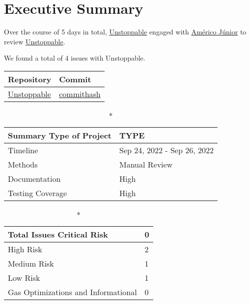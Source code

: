 \hypertarget{executive-summary}{%
\section{Executive Summary}\label{executive-summary}}

Over the course of 5 days in total, \href{https://www.damnvulnerabledefi.xyz/challenges/1.html}{Unstoppable} engaged with
\href{https://americojunior.com}{Américo Júnior} to review
\href{https://www.damnvulnerabledefi.xyz/challenges/1.html}{Unstoppable}. 

We found a total of 4 issues with Unstoppable. 

\begin{longtable}[c]{|l|l|}
\hline \textbf{Repository} & \textbf{Commit} \\

\hline
\href{https://www.damnvulnerabledefi.xyz/challenges/1.html}{Unstoppable} &
\href{https://github.com/permalink/commit/commithash}{commithash} \\
\hline
\end{longtable}

\begin{longtable}[]{|l|l|}

\caption*{\textbf{Summary}}
\hline Type of Project & TYPE \\   
\hline Timeline & Sep 24, 2022 - Sep 26, 2022   \\
\hline Methods & Manual Review \\
\hline Documentation & High \\
\hline Testing Coverage & High  \\
\hline
\end{longtable}


\begin{longtable}[]{|l|l|}
\caption*{\textbf{Total Issues}}
\hline Critical Risk & 0 \\
\hline High Risk & 2 \\
\hline Medium Risk & 1 \\ 
\hline Low Risk & 1 \\
\hline Gas Optimizations and Informational & 0 \\
\hline
\end{longtable}

